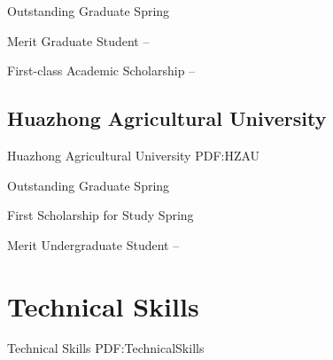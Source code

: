 \documentclass[letterpaper,10pt,oneside]{article}
\begin{document}
\begin{body}
\BulletItem
Outstanding Graduate
\hfill
Spring 

\GapNoBreak

\BulletItem
Merit Graduate Student
\hfill
{} --

\GapNoBreak
\BulletItem
First-class Academic Scholarship
\hfill
{} --
\BigGap
\GapNoBreak
\subsection
{Huazhong Agricultural University}
{Huazhong Agricultural University}
{PDF:HZAU}

\BulletItem
Outstanding Graduate
\hfill
Spring 

\GapNoBreak
\BulletItem
First Scholarship for Study 
\hfill
Spring 

\GapNoBreak
\BulletItem
Merit Undergraduate Student
\hfill
{} --





\iffalse
\section
{Languages}
{Languages}
{PDF:Languages}

\BulletItem
English: Native language.

\GapNoBreak
\BulletItem
Spanish: Fluent (speaking, reading, writing).

\GapNoBreak
\BulletItem
Latin: Intermediate (reading); basic (speaking, writing).
\fi

\section
{Technical Skills}
{Technical Skills}
{PDF:TechnicalSkills}


\end{body}
\end{document}
